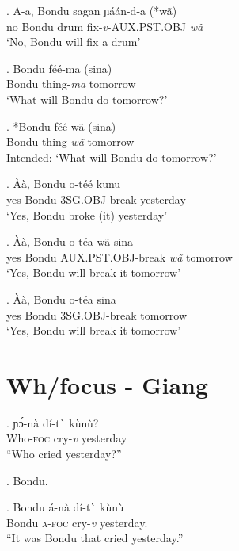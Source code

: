\documentclass{assets/fieldnotes}
\begin{document}
\exg. A-a, Bondu sagan ɲáán-d-a (*wã)\\
no Bondu drum fix-\textit{v}-AUX.PST.OBJ \textit{wã}\\
`No, Bondu will fix a drum'\\

\exg. Bondu féé-ma (sina)\\
Bondu thing-\textit{ma} tomorrow\\
`What will Bondu do tomorrow?'

\exg. *Bondu féé-wã (sina)\\
Bondu thing-\textit{wã} tomorrow\\
Intended: `What will Bondu do tomorrow?'\\

\exg. Àà, Bondu o-téé kunu\\
yes Bondu 3SG.OBJ-break yesterday\\
`Yes, Bondu broke (it) yesterday'\\

\exg. Àà, Bondu o-téa wã sina\\
yes Bondu AUX.PST.OBJ-break \textit{wã} tomorrow\\
`Yes, Bondu will break it tomorrow'

\exg. Àà, Bondu o-téa sina\\
yes Bondu 3SG.OBJ-break tomorrow\\
`Yes, Bondu will break it tomorrow'\\


\section{Wh/focus - Giang}

\exg. ɲɔ́-nà dí-t\`{} kùnù?\\
Who-\textsc{foc} cry-\textit{v} yesterday\\
``Who cried yesterday?''

\ex. Bondu.

\exg. Bondu á-nà dí-t\`{} kùnù\\
Bondu \textsc{a-foc} cry-\textit{v} yesterday.\\
``It was Bondu that cried yesterday.'' 
\end{document}
